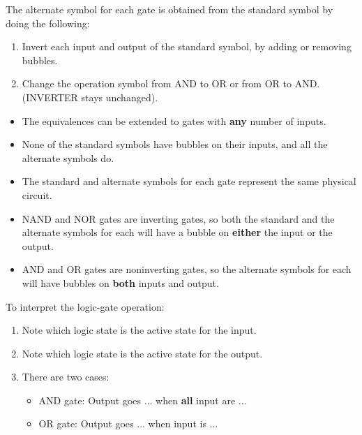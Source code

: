         \par The alternate symbol for each gate is obtained from the standard
        symbol by doing the following:
        \begin{enumerate}
            \item Invert each input and output of the standard symbol, by adding or removing bubbles.
            \item Change the operation symbol from AND to OR or from OR to AND.
                (INVERTER stays unchanged).
        \end{enumerate}
        \begin{itemize}
            \item The equivalences can be extended to gates with \textbf{any} number of inputs.
            \item None of the standard symbols have bubbles on their inputs, and all the alternate
                symbols do.
            \item The standard and alternate symbols for each gate represent the same physical
                circuit.
            \item NAND and NOR gates are inverting gates, so both the standard and the alternate
                symbols for each will have a bubble on \textbf{either} the input or the output.
            \item AND and OR gates are noninverting gates, so the alternate symbols for each will
                have bubbles on \textbf{both} inputs and output.
        \end{itemize}
        \par To interpret the logic-gate operation:
        \begin{enumerate}
            \item Note which logic state is the active state for the input.
            \item Note which logic state is the active state for the output.
            \item There are two cases:
                \begin{itemize}
                    \item AND gate: Output goes ... when \textbf{all} input are ...
                    \item OR gate: Output goes ... when  input is ...
                \end{itemize}
        \end{enumerate}

